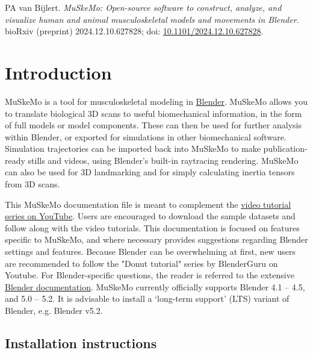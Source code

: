 \documentclass{article}
\begin{document}
\noindent
PA van Bijlert. \textit{MuSkeMo: Open-source software to construct, analyze, and visualize human and animal musculoskeletal models and movements in Blender}. bioRxiv (preprint) 2024.12.10.627828; doi: \href{https://doi.org/10.1101/2024.12.10.627828}{10.1101/2024.12.10.627828}.

\vfill  %

\newpage  %


\tableofcontents

\newpage
\section{Introduction}

MuSkeMo is a tool for musculoskeletal modeling in \href{https://www.blender.org}{Blender}. MuSkeMo allows you to translate biological 3D scans to useful biomechanical information, in the form of full models or model components. These can then be used for further analysis within Blender, or exported for simulations in other biomechanical software. Simulation trajectories can be imported back into MuSkeMo to make publication-ready stills and videos, using Blender's built-in raytracing rendering. MuSkeMo can also be used for 3D landmarking and for simply calculating inertia tensors from 3D scans.

This MuSkeMo documentation file is meant to complement the \href{https://youtube.com/playlist?list=PLfgxaucAWlEp5-cavvXmdrTIWYT_tgZYK&si=Cdl9MchuLP5aRJNL}{video tutorial series on YouTube}. Users are encouraged to download the sample datasets and follow along with the video tutorials.
This documentation is focused on features specific to MuSkeMo, and where necessary provides suggestions regarding Blender settings and features. Because Blender can be overwhelming at first, new users are recommended to follow the "Donut tutorial" series by BlenderGuru on Youtube. For Blender-specific questions, the reader is referred to the extensive \href{https://docs.blender.org/}{Blender documentation}. MuSkeMo currently officially supports Blender 4.1 -- 4.5, and 5.0 -- 5.2. It is advisable to install a `long-term support' (LTS) variant of Blender, e.g. Blender v5.2.

\subsection{Installation instructions}
\end{document}
